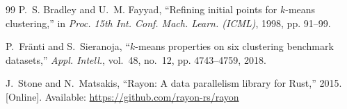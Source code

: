 \documentclass[journal]{IEEEtran}
\begin{document}
\begin{thebibliography}{99}
P.~S. Bradley and U.~M. Fayyad, ``Refining initial points for $k$-means clustering,'' in \emph{Proc. 15th Int. Conf. Mach. Learn. (ICML)}, 1998, pp. 91--99.

P.~Fr\"{a}nti and S.~Sieranoja, ``$k$-means properties on six clustering benchmark datasets,'' \emph{Appl. Intell.}, vol.~48, no.~12, pp. 4743--4759, 2018.

J.~Stone and N.~Matsakis, ``Rayon: A data parallelism library for Rust,'' 2015. [Online]. Available: \url{https://github.com/rayon-rs/rayon}

\end{thebibliography}
\end{document}
